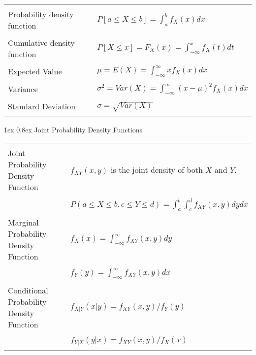 \documentclass[10pt,landscape]{article}
\makeatletter
\renewcommand{\subsection}{\@startsection{subsection}{2}{0mm}%
                                {1ex} %
                                {0.8ex} %
                                {\normalfont\normalsize\bfseries}}
\makeatother
\begin{document}
\begin{multicols}{2}
\begin{tabular}{@{}ll@{}}
        & \\
   Probability density function &  $P[a \le X \le b] = \int_a^b f_X(x) dx$ \\
        & \\
   Cumulative density function &  $P[X \le x] = F_X(x) = \int_{-\infty}^x f_X(t)dt$ \\
        & \\
   Expected Value & $\mu = E(X) = \int_{-\infty}^{\infty} x f_X(x) dx$ \\
        & \\
   Variance & $\sigma^2 = Var(X) = \int_{-\infty}^{\infty} (x - \mu)^2 f_X(x) dx$ \\
        & \\
   Standard Deviation & $\sigma = \sqrt{Var(X)}$ \\
        & \\
\end{tabular}

\subsection{Joint Probability Density Functions}

\begin{tabular}{@{}ll@{}}
        & \\
   Joint Probability Density Function & $f_{XY}(x, y)$ is the joint density of both $X$ and $Y$. \\
        & \\
                              & $ P(a \le X \le b, c \le Y \le d) = \int_{a}^{b} \int_{c}^{d} f_{XY}(x,y) dy dx $\\
        & \\
   Marginal Probability Density Function & $f_X(x) = \int_{-\infty}^{\infty} f_{XY}(x,y) dy$ \\
        & \\
                                         & $f_Y(y) = \int_{-\infty}^{\infty} f_{XY}(x,y) dx$ \\
        & \\
   Conditional Probability Density Function & $f_{X|Y}(x|y) = f_{XY}(x,y)/f_{Y}(y)$ \\
        & \\
                                    & $f_{Y|X}(y|x) = f_{XY}(x,y)/f_{X}(x)$ \\
        & \\
\end{tabular}


\end{multicols}
\end{document}
